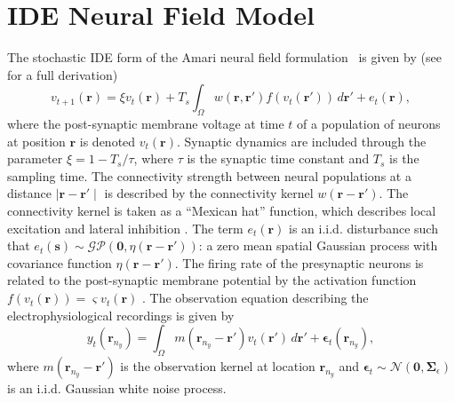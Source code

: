 \documentclass[journal]{IEEEtran}
\newcommand{\ken}[1]{\textsf{\emph{\textbf{\textcolor{magenta}{#1}}}}}
\begin{document}
\section{IDE Neural Field Model}
The stochastic IDE form of the Amari neural field  formulation~\cite{Amari1977} is given by (see~\cite{Freestone2011} for a full derivation)
\begin{equation}\label{eq:DiscreteTimeModel}
	v_{t+1}\left(\mathbf{r}\right) = 
	\xi v_t\left(\mathbf{r}\right) + 
	T_s \int_\Omega { 
	    w\left(\mathbf{r},\mathbf{r'}\right)
	    f\left(v_t\left(\mathbf{r}'\right)\right) 
	\, d\mathbf{r}'} 
	+ e_t\left(\mathbf{r}\right), 
\end{equation}
where the post-synaptic membrane voltage at time $t$ of a population of neurons at position $\mathbf r$ is denoted $v_t\left(\mathbf r\right)$. Synaptic dynamics are included through the parameter $\xi=1-T_s/\tau$, where $\tau$ is the synaptic time constant and $T_s$ is the sampling time. The connectivity strength between neural populations at a distance $\mid\mathbf{r}-\mathbf{r'}\mid$ is described by the connectivity kernel $w\left(\mathbf{r}-\mathbf{r}'\right)$. The connectivity kernel is taken as a ``Mexican hat'' function, which describes local excitation and lateral inhibition \cite{Amari1977}. The term $e_t(\mathbf r)$ is an i.i.d. disturbance such that $e_t(\mathbf{s})\sim\mathcal{GP}(\mathbf 0,\eta(\mathbf{r}-\mathbf{r'}))$: a zero mean spatial Gaussian process with covariance function $\eta(\mathbf{r}-\mathbf{r'})$. The firing rate of the presynaptic neurons is related to the post-synaptic membrane potential by the activation function $f(v_t(\mathbf{r})) = \varsigma v_t(\mathbf{r})$ \cite{VanRotterdam1982,Murphy2009}.
The observation equation describing the electrophysiological recordings is given by
\begin{equation}\label{eq:ObservationEquation}
	y_t(\mathbf{r}_{n_y}) = \int_{\Omega} { m\left(\mathbf{r}_{n_y}-\mathbf{r}'\right) v_t\left(\mathbf{r}'\right) \, d\mathbf{r}'} + \boldsymbol\epsilon_t(\mathbf{r}_{n_y}), 
\end{equation}
where $m\left(\mathbf{r}_{n_y}-\mathbf{r}'\right)$ is the observation kernel at location $\mathbf{r}_{n_y}$ and  $\boldsymbol{\epsilon}_{t}\sim \mathcal{N}\left(\mathbf{0},\mathbf{\Sigma}_{\epsilon}\right)$  is an i.i.d. Gaussian white noise process. %
\end{document}
